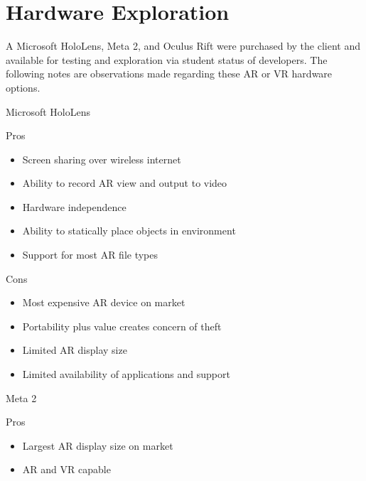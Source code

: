 

\chapter{Hardware Exploration}

A Microsoft HoloLens, Meta 2, and Oculus Rift were purchased by the client and available for testing and exploration via student status of developers. The following notes are observations made regarding these AR or VR hardware options.

\begin{description}
\item Microsoft HoloLens
	\begin{description} 
		\item Pros
		\begin{itemize}
			\item Screen sharing over wireless internet  
			\item Ability to record AR view and output to video
			\item Hardware independence
			\item Ability to statically place objects in environment
			\item Support for most AR file types
		\end{itemize}
	\end{description}
	\begin{description} 
		\item Cons
		\begin{itemize}
			\item Most expensive AR device on market
			\item Portability plus value creates concern of theft
			\item Limited AR display size
			\item Limited availability of applications and support
		\end{itemize}
	\end{description}
\item Meta 2
	\begin{description} 
	\item Pros
	\begin{itemize}
		\item Largest AR display size on market
		\item AR and VR capable
	\end{itemize}
\end{description}
\begin{description} 

\end{description}
\end{description}
